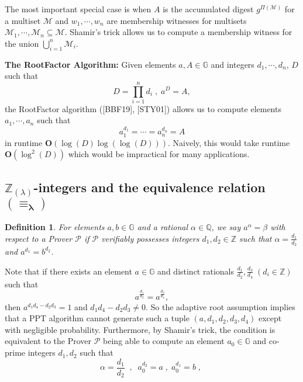 \documentclass[11pt, lettersize, notitlepage, leqno, footskip=0.6cm]{article}
\newcommand{\bz}{\mathbb Z}
\newcommand{\bq}{\mathbb Q}
\newcommand{\pl}{\prod\limits}
\newcommand{\slim}{\sum\limits}
\newcommand{\mc}{\mathcal}
\newcommand{\mb}{\mathbb}
\newcommand{\mbf}{\mathbf}
\newcommand{\al}{\alpha}
\newcommand{\be}{\beta}
\newcommand{\lam}{\lambda}
\newcommand{\lamb}{\lambda}
\newcommand{\sub}{\subseteq}
\newcommand{\mP}{\mc{P}}
\newcommand{\vs}{\vspace{-0.15cm}}
\newcommand{\noin}{\noindent}
\newcommand{\op}{overwhelming probability}
\newcommand{\LCM}{\mbf{lcm}}
\newtheorem{Def}{Definition}[section]
\numberwithin{equation}{section}
\begin{document}
The most important special case is when $A$ is the accumulated digest $g^{\Pi(\mc{M})}$ for a multiset $\mc{M}$ and $w_1,\cdots,w_n$ are membership witnesses for multisets $\mc{M}_1,\cdots,\mc{M}_n\sub \mc{M}$. Shamir's trick allows us to compute a membership witness for the union $\bigcup\limits_{i=1}^n \mc{M}_i$. 

\begin{comment} Conversely, for any element $b = \pl_{i=1}^n a_i^{x_i}$ $(x_i\in\bz)$, we have \vs $$ b^{\LCM(d_1,\cdots,d_n)} = A^{\slim_{i=1}^n  \frac{\LCM(d_1,\cdots,d_n)x_i}{d_i}} $$ and the low order assumption implies that with \op, \vs $$b =  a^{\slim_{i=1}^n  \frac{\LCM(d_1,\cdots,d_n)x_i}{d_i}}.$$ Thus, $b$ is expressible as a power of $a$. 

\end{comment}

\vspace{0.2cm}


\noindent \textbf{The RootFactor Algorithm:} Given elements $a, A\in\mb{G}$ and integers $d_1,\cdots, d_n$, $D$ such that \vs $$D= \pl_{i=1}^n d_i\; ,\; a^{D} = A,$$ the RootFactor algorithm ([BBF19], [STY01]) allows us to compute elements $a_1,\cdots, a_n$ such that \vs $$a_1^{d_1}=\cdots = a_n^{d_n} = A$$ in runtime $\mbf{O}(\log(D)\log(\log(D)))$. Naively, this would take runtime $\mbf{O}(\log^2(D))$ which would be impractical for many applications.


\subsection{\fontsize{11}{11}\selectfont $\bz_{(\lamb)}$-integers and the equivalence relation $\mathbf{(\equiv_{\lam})}$}


\begin{Def} For elements $a, b\in\mb{G}$ and a rational $\al\in\bq$, we say $a^{\al} = \be$ with respect to a Prover $\mP$ if $\mP$ verifiably possesses integers $d_1,d_2\in\bz$ such that $\al = \frac{d_1}{d_2}$ and  $a^{d_1} = b^{d_2}$.\end{Def}

\noin Note that if there exists an element $a\in\mb{G}$ and distinct rationals $\frac{d_1}{d_2}, \frac{d_3}{d_4}\;(d_i\in\bz)$ such that \vs $$a^{\frac{d_1}{d_2}} = a^{\frac{d_3}{d_4}},$$ then $a^{d_1d_4-d_2d_3} = 1$ and $d_1d_4-d_2d_3\neq 0$. So the adaptive root assumption implies that a PPT algorithm cannot generate such a tuple $(a,d_1,d_2,d_3,d_4)$ except with negligible probability. Furthermore, by Shamir's trick, the condition is equivalent to the Prover $\mP$ being able to compute an element $a_0\in\mb{G}$ and co-prime integers $d_1,d_2$ such that \vs $$\al = \frac{d_1}{d_2}\;\;,\;\;a_0^{d_2} =a\;,\; a_0^{d_1} =b\;,\; $$
\end{document}
